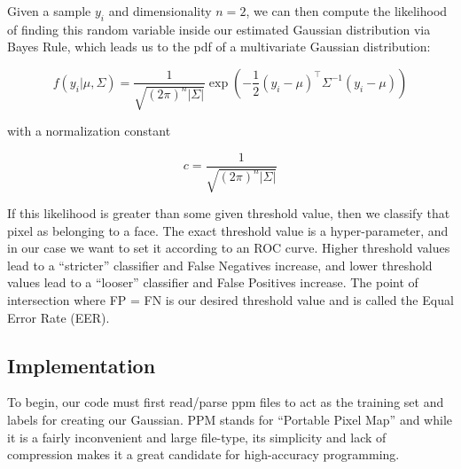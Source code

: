 \documentclass[headings=optiontoheadandtoc,listof=totoc,parskip=full]{scrartcl}
\begin{document}
Given a sample $y_i$ and dimensionality $n=2$, we can then compute the likelihood of finding this random variable inside our estimated Gaussian distribution via Bayes Rule, which leads us to the pdf of a multivariate Gaussian distribution:

\begin{equation}
     f(y_{i}|\mu,\Sigma) = \frac{1}{\sqrt{(2\pi)^{n}|\Sigma|}}\exp(-\frac{1}{2}(y_{i}-\mu)^\top\Sigma^{-1}(y_{i}-\mu))
\end{equation}

with a normalization constant

\begin{equation}
     c = \frac{1}{\sqrt{(2\pi)^{n}|\Sigma|}} \label{eq:normalize-constant}
\end{equation}


If this likelihood is greater than some given threshold value, then we classify that pixel as belonging to a face. The exact threshold value is a hyper-parameter, and in our case we want to set it according to an ROC curve. Higher threshold values lead to a ``stricter'' classifier and False Negatives increase, and lower threshold values lead to a ``looser'' classifier and False Positives increase. The point of intersection where FP = FN is our desired threshold value and is called the Equal Error Rate (EER).

\subsection{Implementation}
\label{sec:part-3-impl}

To begin, our code must first read/parse ppm files to act as the training set and labels for creating our Gaussian. PPM stands for ``Portable Pixel Map'' and while it is a fairly inconvenient and large file-type, its simplicity and lack of compression makes it a great candidate for high-accuracy programming.
\end{document}
